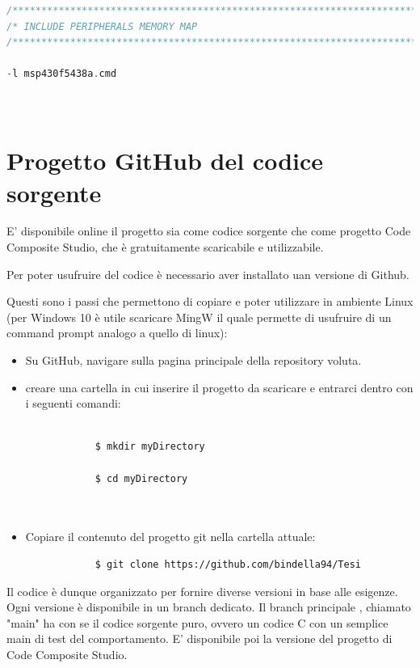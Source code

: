 \documentclass[LaM,binding=0.6cm]{../sapthesis}
\begin{document}
\begin{lstlisting}[language=C]
/****************************************************************************/
/* INCLUDE PERIPHERALS MEMORY MAP                                           */
/****************************************************************************/

-l msp430f5438a.cmd

    
\end{lstlisting}

\chapter{Progetto GitHub del codice sorgente}
E' disponibile online il progetto sia come codice sorgente che come progetto Code Composite Studio, che è gratuitamente
scaricabile e utilizzabile.

Per poter usufruire del codice è necessario aver installato uan versione di Github.

Questi sono i passi che permettono di copiare e poter utilizzare in ambiente Linux (per Windows 10 è utile scaricare MingW 
il quale permette di usufruire di un command prompt analogo a quello di linux):

\begin{itemize}
     \item Su GitHub, navigare sulla pagina principale della repository voluta.
    
    \item creare una cartella in cui inserire il progetto da scaricare e entrarci dentro con i seguenti comandi:
    \begin{verbatim}

            $ mkdir myDirectory
            
            $ cd myDirectory
      
     
    \end{verbatim}
    \item Copiare il contenuto del progetto git nella cartella attuale:
        \begin{verbatim}
            $ git clone https://github.com/bindella94/Tesi
        \end{verbatim}
\end{itemize}

Il codice è dunque organizzato per fornire diverse versioni in base alle esigenze.
Ogni versione è disponibile in un branch dedicato. Il branch principale , chiamato "main" ha con se il codice sorgente puro, ovvero un codice C con un semplice main di test del comportamento.
E' disponibile poi la versione del progetto di Code Composite Studio.
\end{document}
